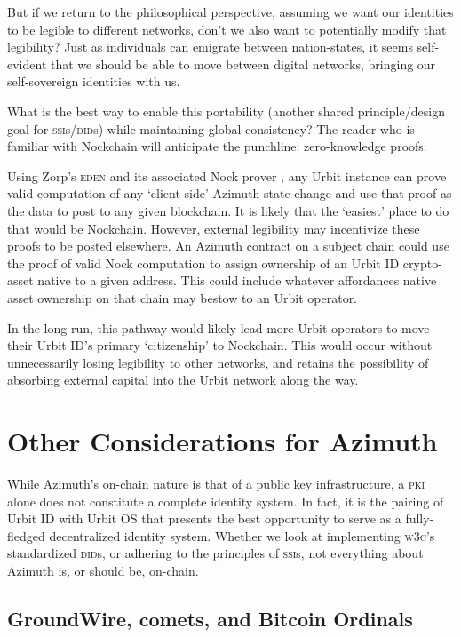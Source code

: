 \documentclass[twoside]{article}
\begin{document}
But if we return to the philosophical perspective, assuming we want our identities to be legible to different networks, don't we also want to potentially modify that legibility? Just as individuals can emigrate between nation-states, it seems self-evident that we should be able to move between digital networks, bringing our self-sovereign identities with us.

What is the best way to enable this portability (another shared principle/design goal for \textsc{ssi}s/\textsc{did}s) while maintaining global consistency? The reader who is familiar with Nockchain will anticipate the punchline:  zero-knowledge proofs.

Using Zorp's \textsc{eden} and its associated Nock prover \citep{Zorp2023}, any Urbit instance can prove valid computation of any `client-side' Azimuth state change and use that proof as the data to post to any given blockchain. It is likely that the `easiest' place to do that would be Nockchain. However, external legibility may incentivize these proofs to be posted elsewhere. An Azimuth contract on a subject chain could use the proof of valid Nock computation to assign ownership of an Urbit ID crypto-asset native to a given address. This could include whatever affordances native asset ownership on that chain may bestow to an Urbit operator.

In the long run, this pathway would likely lead more Urbit operators to move their Urbit ID's primary `citizenship' to Nockchain. This would occur without unnecessarily losing legibility to other networks, and retains the possibility of absorbing external capital into the Urbit network along the way.


\section{Other Considerations for Azimuth}

While Azimuth's on-chain nature is that of a public key infrastructure, a \textsc{pki} alone does not constitute a complete identity system. In fact, it is the pairing of Urbit ID with Urbit OS that presents the best opportunity to serve as a fully-fledged decentralized identity system. Whether we look at implementing \textsc{w3c}'s standardized \textsc{did}s, or adhering to the principles of \textsc{ssi}s, not everything about Azimuth is, or should be, on-chain.

\subsection{GroundWire, comets, and Bitcoin Ordinals}
\end{document}

